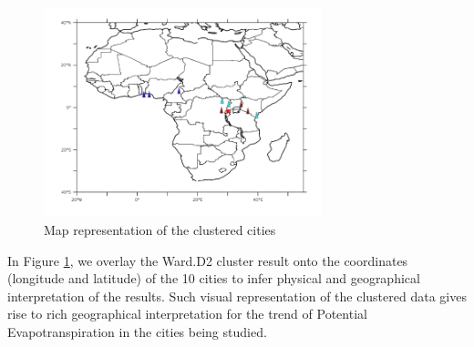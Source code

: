 \documentclass[12pt,a4paper]{article}
\begin{document}
\begin{figure}[!h]
	  \centering
        \includegraphics[height=2.4in]{./gaphics/cluster_map.png}
        \caption{Map representation of the clustered cities}
        \label{fig:cluster_map}
\end{figure}

In Figure \ref{fig:cluster_map}, we overlay the Ward.D2 cluster result onto the coordinates (longitude and latitude) of the 10 cities to infer physical and geographical interpretation of the results.  Such visual representation of the clustered data gives rise to rich geographical interpretation for the trend of Potential Evapotranspiration in the cities being studied.
\end{document}
